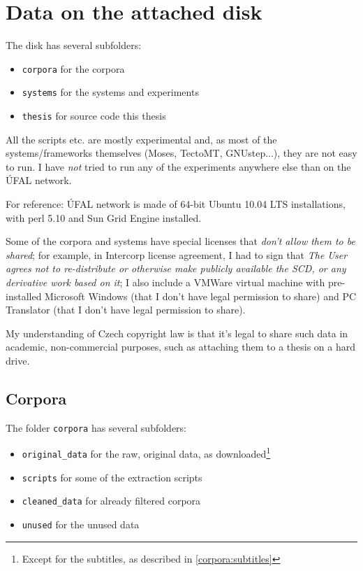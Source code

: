 \chapter{Data on the attached disk}

The disk has several subfolders:
\begin{itemize}
\item \texttt{corpora} for the corpora
\item \texttt{systems}  for the systems and experiments
\item \texttt{thesis} for \XeLaTeX source code this thesis
\end{itemize}

All the scripts etc. are mostly experimental and, as most of the systems/frameworks themselves (Moses, TectoMT, GNUstep...), they are not easy to run. I have \emph{not} tried to run any of the experiments anywhere else than on the ÚFAL network. 

For reference: ÚFAL network is made of 64-bit Ubuntu 10.04 LTS installations, with perl 5.10 and Sun Grid Engine installed.

Some of the corpora and systems have special licenses that \emph{don't allow them to be shared}; for example, in Intercorp license agreement, I had to sign that \emph{The User agrees not to re-distribute or otherwise make publicly available the SCD, or any derivative work based on it}; I also include a VMWare virtual machine with pre-installed Microsoft Windows (that I don't have legal permission to share) and PC Translator (that I don't have legal permission to share). 

My understanding of Czech copyright law is that it's legal to share such data in academic, non-commercial purposes, such as attaching them to a thesis on a hard drive.

\section{Corpora}
The folder \texttt{corpora} has several subfolders:
\begin{itemize}
\item \texttt{original\_data} for the raw, original data, as downloaded\footnote{Except for the subtitles, as described in \ref{corpora:subtitles}}
\item \texttt{scripts} for some of the extraction scripts
\item \texttt{cleaned\_data} for already filtered corpora
\item \texttt{unused} for the unused data
\end{itemize}

